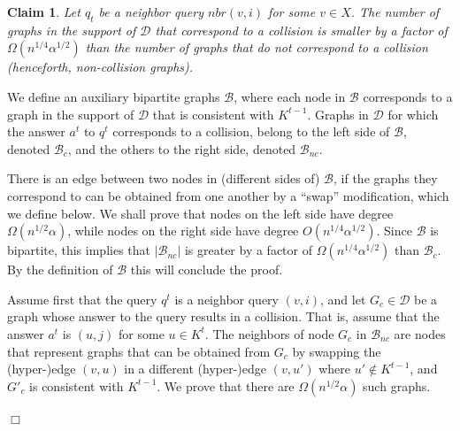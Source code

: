 \documentclass{article}
\newcommand{\calB}{{\mathcal{B}}}
\newcommand{\calD}{{\mathcal{D}}}
\newenvironment{proof}{\smallskip\noindent{\bf Proof:}}%
        {\hspace*{\fill}$\Box$\par}
\newtheorem{claim}[lemma]{Claim}
\begin{document}
\iffalse
\begin{claim}
    Let $q_t$ be a neighbor query $nbr(v,i)$ for some $v\in X$.
    The number of graphs in the support of $\calD$ that correspond to a collision is smaller by a factor of $\Omega(n^{1/4}\alpha^{1/2})$ than the number of graphs that do not correspond to a collision (henceforth, non-collision graphs).
\end{claim}
\begin{proof}
    We define an  auxiliary bipartite  graphs $\calB$, where each node in $\calB$ corresponds to a graph in the support of $\calD$ that is consistent with $K^{t-1}$.
   Graphs in $\calD$ for which the answer $a^t$ to $q^t$ corresponds to a collision, belong to the left side of $\calB$, denoted $\calB_{c}$, and the others to the right side, denoted $\calB_{nc}$.


    There is an edge between two nodes in (different sides of) $\calB$, if the graphs they correspond to can be obtained from one another by a ``swap'' modification, which we define below.
    We shall prove that nodes  on the left side have degree $\Omega(n^{1/2}\alpha)$, while nodes on the right side have degree $O(n^{1/4}\alpha^{1/2})$. Since $\calB$ is bipartite, this implies that $|\calB_{nc}|$ is greater by a factor of $\Omega(n^{1/4}\alpha^{1/2})$ than $\calB_{c}$. By the definition of $\calB$ this will conclude the proof.

    Assume first that the query $q^t$ is a neighbor query $(v,i)$, and let $G_{c} \in \calD$ be a graph whose answer to the query results in a collision. That is, assume that the answer $a^t$ is $(u,j)$ for some $u\in K^t$. The neighbors of node $G_{c}$ in $\calB_{nc}$ are nodes that represent graphs that can be obtained from $G_{c}$ by swapping the (hyper-)edge $(v,u)$ in a different (hyper-)edge $(v, u')$ where $u'\notin K^{t-1}$, and  $G'_{c}$ is consistent with $K^{t-1}$. We prove that there are $\Omega(n^{1/2}\alpha)$ such graphs.


\end{proof}
\end{document}
